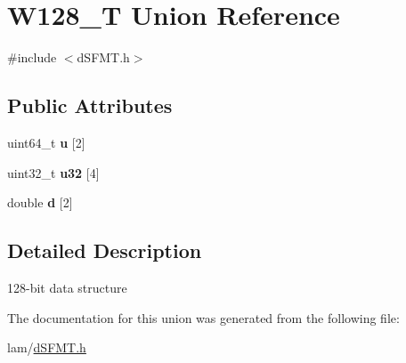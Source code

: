 \hypertarget{unionW128__T}{
\section{W128\_\-T Union Reference}
\label{unionW128__T}
}


{\ttfamily \#include $<$dSFMT.h$>$}\subsection*{Public Attributes}
\begin{DoxyCompactItemize}
\item 
\hypertarget{unionW128__T_a5f9319b0fdb9a62cc93fb5aade53e641}{
uint64\_\-t {\bfseries u} \mbox{[}2\mbox{]}}
\label{unionW128__T_a5f9319b0fdb9a62cc93fb5aade53e641}

\item 
\hypertarget{unionW128__T_a0fe5abc7066ccd41c10cbc6ad9d44195}{
uint32\_\-t {\bfseries u32} \mbox{[}4\mbox{]}}
\label{unionW128__T_a0fe5abc7066ccd41c10cbc6ad9d44195}

\item 
\hypertarget{unionW128__T_af1781b30d4052a0832fb7e7cd992cb75}{
double {\bfseries d} \mbox{[}2\mbox{]}}
\label{unionW128__T_af1781b30d4052a0832fb7e7cd992cb75}

\end{DoxyCompactItemize}


\subsection{Detailed Description}
128-\/bit data structure 

The documentation for this union was generated from the following file:\begin{DoxyCompactItemize}
\item 
lam/\hyperlink{dSFMT_8h}{dSFMT.h}\end{DoxyCompactItemize}
